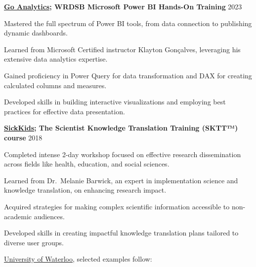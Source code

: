 \documentclass[10pt]{article}
\newenvironment{innerlist}[1][\enskip\textbullet]%
        {\begin{compactenum}[#1]}{\end{compactenum}}
\providecommand{\tightlist}{%
  \setlength{\itemsep}{0pt}\setlength{\parskip}{0pt}}
\begin{document}
\begin{outerlist}
\tightlist
\item
  \textbf{\href{https://goanalyticsbi.com/workshops/}{Go Analytics};
  WRDSB Microsoft Power BI Hands-On Training} \hfill 2023

 \begin{innerlist}
  \tightlist
  \item
    Mastered the full spectrum of Power BI tools, from data connection
    to publishing dynamic dashboards.
  \item
    Learned from Microsoft Certified instructor Klayton Gonçalves,
    leveraging his extensive data analytics expertise.
  \item
    Gained proficiency in Power Query for data transformation and DAX
    for creating calculated columns and measures.
  \item
    Developed skills in building interactive visualizations and
    employing best practices for effective data presentation.
 \end{innerlist}
\item
  \textbf{\href{https://www.sickkids.ca/en/learning/our-programs/knowledge-translation-program/}{SickKids};
  The Scientist Knowledge Translation Training (SKTT™) course}
  \hfill 2018

 \begin{innerlist}
  \tightlist
  \item
    Completed intense 2-day workshop focused on effective research
    dissemination across fields like health, education, and social
    sciences.
  \item
    Learned from Dr.~Melanie Barwick, an expert in implementation
    science and knowledge translation, on enhancing research impact.
  \item
    Acquired strategies for making complex scientific information
    accessible to non-academic audiences.
  \item
    Developed skills in creating impactful knowledge translation plans
    tailored to diverse user groups.
 \end{innerlist}
\end{outerlist}

\href{http://www.uwaterloo.ca/}{University of Waterloo}, selected
examples follow:
\end{document}
